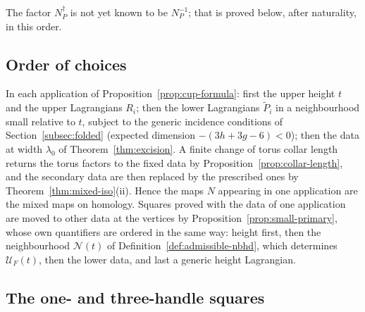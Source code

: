 \documentclass[11pt]{amsart}
\theoremstyle{definition}
\theoremstyle{remark}
\theoremstyle{plain}
\numberwithin{equation}{section}
\begin{document}
The factor $N^\dagger_P$ is not yet known to be $N_P^{-1}$; that is proved below, after
naturality, in this order.

\subsection{Order of choices}\label{subsec:order}

In each application of
Proposition~\ref{prop:cup-formula}: first the upper height $t$ and the upper Lagrangians $R_i$; then the lower Lagrangians $\widetilde P_i$ in a neighbourhood small
relative to $t$, subject to the generic incidence conditions of
Section~\ref{subsec:folded} (expected dimension $-(3h+3g-6)<0$); then the data at width $\lambda_0$ of Theorem~\ref{thm:excision}. A finite change of torus
collar length returns the torus factors to the fixed data by
Proposition~\ref{prop:collar-length}, and the secondary data are then replaced
by the prescribed ones by Theorem~\ref{thm:mixed-iso}(ii). Hence the maps $N$
appearing in one application are the mixed maps on homology. Squares proved with
the data of one application are moved to other data at the vertices by
Proposition~\ref{prop:small-primary}, whose own quantifiers are ordered in the
same way: height first, then the neighbourhood $\mathcal N(t)$ of
Definition~\ref{def:admissible-nbhd}, which determines $\mathcal U_F(t)$, then the lower data,
and last a generic height Lagrangian.

\subsection{The one- and three-handle squares}\label{subsec:one-three-squares}
\end{document}
